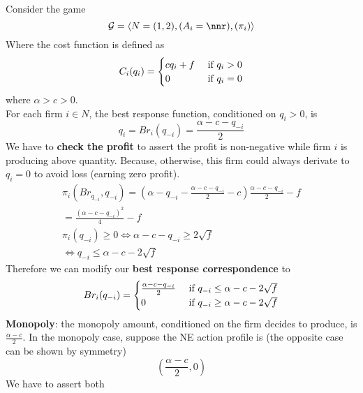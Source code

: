 \documentclass[11pt]{article}
\begin{document}
	\begin{example}
		Consider the game 
		\begin{equation}
			\mc{G} = \langle N = (1,2), (A_i = \nnr), (\pi_i) \rangle
		\end{equation}
		Where the cost function is defined as
		\begin{equation}
			C_i(q_i) = \begin{cases}
				c q_i + f &\text{{ if }} q_i > 0 \\
				0 &\text{{ if }} q_i = 0
			\end{cases}
		\end{equation}
		where $\alpha > c > 0$. \\
		For each firm $i \in N$, the best response function, conditioned on $q_i > 0$, is
		\begin{equation}
			q_i = Br_i(q_{-i}) = \frac{\alpha - c - q_{-i}}{2}
		\end{equation}
		We have to \textbf{check the profit} to assert the profit is non-negative while firm $i$ is producing above quantity. Because, otherwise, this firm could always derivate to $q_i = 0$ to avoid loss (earning zero profit).
		\begin{gather}
			\pi_i(Br_{q_{-i}}, q_{-i}) = (\alpha - q_{-i} - \frac{\alpha - c - q_{-i}}{2} - c)\frac{\alpha - c - q_{-i}}{2} - f \\
			= \frac{(\alpha - c - q_{-i})^2}{4} - f \\
			\pi_i(q_{-i}) \geq 0 \iff \alpha - c - q_{-i} \geq 2\sqrt{f} \\
			\iff q_{-i} \leq \alpha - c - 2\sqrt{f}
		\end{gather}
		Therefore we can modify our \textbf{best response correspondence} to
		\begin{gather}
			Br_i(q_{-i}) = 
			\begin{cases}
				\frac{\alpha - c - q_{-i}}{2} &\text{{ if }}  q_{-i} \leq \alpha - c - 2\sqrt{f} \\
				0 &\text{{ if }} q_{-i} \geq \alpha - c - 2\sqrt{f}
			\end{cases}
		\end{gather}
		\textbf{Monopoly}: the monopoly amount, conditioned on the firm decides to produce, is $\frac{\alpha - c}{2}$. In the monopoly case, suppose the NE action profile is (the opposite case can be shown by symmetry)
		\begin{equation}
			(\frac{\alpha - c}{2}, 0)
		\end{equation}
		We have to assert both 
		\begin{gather}

\end{gather}
\end{example}
\end{document}
